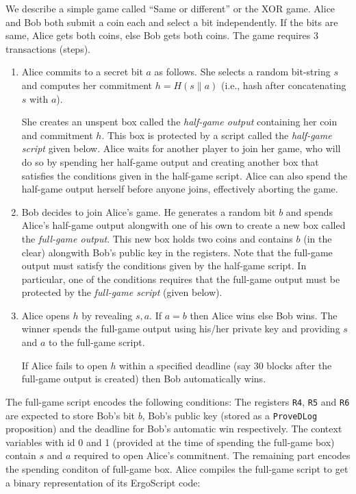 \documentclass[11pt]{article}
\newcommand{\langname}{ErgoScript\xspace}
\begin{document}
We describe a simple game called ``Same or different'' or the XOR game. Alice and Bob both submit a coin each and select a bit independently. If the bits are same, Alice gets both coins, else Bob gets both coins. The game requires 3 transactions (steps). 
\begin{enumerate}
	\item Alice commits to a secret bit $a$ as follows. She selects a random bit-string $s$ and computes her commitment $h = H(s\|a)$ (i.e., hash after concatenating $s$ with $a$).
	
	She creates an unspent box called the {\em half-game output} containing her coin and commitment $h$. This box is protected by a script called the {\em half-game script}  given below. Alice waits for another player to join her game, who will do so by spending her half-game output and creating another box that satisfies the conditions given in the half-game script. Alice can also spend the half-game output herself before anyone joins, effectively aborting the game. 
	

	\item Bob decides to join Alice's game. He generates a random bit $b$ and spends Alice's half-game output alongwith one of his own to create a new box called the {\em full-game output}. This new box  holds two coins and contains $b$ (in the clear) alongwith Bob's public key in the registers. 
	Note that the full-game output must satisfy the conditions given by the half-game script. In particular, one of the conditions requires that the full-game output must be protected by the {\em full-game script} (given below).
	\item Alice opens $h$ by revealing $s, a$. If $a = b$ then Alice wins else Bob wins. The winner spends the full-game output using his/her private key and providing $s$ and $a$ to the full-game script.

	If Alice fails to open $h$ within a specified deadline (say 30 blocks after the full-game output is created) then Bob automatically wins. 
\end{enumerate}

The full-game script encodes the following conditions: The registers \texttt{R4}, \texttt{R5} and \texttt{R6} are expected to store Bob's bit $b$, Bob's public key (stored as a \texttt{ProveDLog} proposition) and the deadline for Bob's automatic win respectively. The context variables with id 0 and 1 (provided at the time of spending the full-game box) contain $s$ and $a$ required to open Alice's commitnent. The remaining part encodes the spending conditon of full-game box. Alice compiles the full-game script to get a binary representation of its \langname code: 
\end{document}
